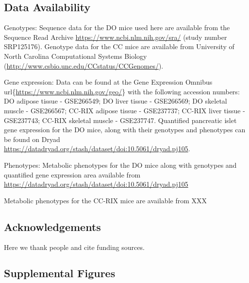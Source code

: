 \documentclass[
]{article}
\newcommand{\beginsupplement}{%
        \setcounter{table}{0}
        \renewcommand{\thetable}{S\arabic{table}}%
        \setcounter{figure}{0}
        \renewcommand{\thefigure}{S\arabic{figure}}%
     }
\begin{document}
\subsection{Data Availability}\label{data-availability}

Genotypes: Sequence data for the DO mice used here are available from
the Sequence Read Archive \url{https://www.ncbi.nlm.nih.gov/sra/} (study
number SRP125176). Genotype data for the CC mice are available from
University of North Carolina Computational Systems Biology
(\url{http://www.csbio.unc.edu/CCstatus/CCGenomes/}).

Gene expression: Data can be found at the Gene Expression Omnibus
url\{\url{https://www.ncbi.nlm.nih.gov/geo/}\} with the following
accession numbers: DO adipose tissue - GSE266549; DO liver tissue -
GSE266569; DO skeletal muscle - GSE266567; CC-RIX adipose tissue -
GSE237737; CC-RIX liver tissue - GSE237743; CC-RIX skeletal muscle -
GSE237747. Quantified pancreatic islet gene expression for the DO mice,
along with their genotypes and phenotypes can be found on Dryad
\url{https://datadryad.org/stash/dataset/doi:10.5061/dryad.pj105}.

Phenotypes: Metabolic phenotypes for the DO mice along with genotypes
and quantified gene expression area available from
\url{https://datadryad.org/stash/dataset/doi:10.5061/dryad.pj105}

Metabolic phenotypes for the CC-RIX mice are available from XXX

\subsection{Acknowledgements}\label{acknowledgements}

Here we thank people and cite funding sources.

\pagebreak
\beginsupplement

\subsection{Supplemental Figures}\label{supplemental-figures}
\end{document}
